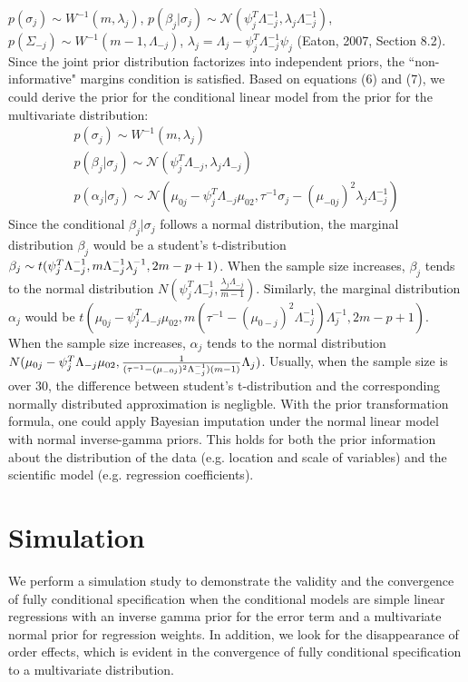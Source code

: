 	$p(\sigma_{j}) \sim W^{-1}(m, \lambda_j)$, $p(\beta_{j}|\sigma_{j}) \sim \mathcal{N}(\psi_{j}^T\Lambda_{-j}^{-1}, \lambda_j\Lambda_{-j}^{-1})$, $p(\Sigma_{-j}) \sim W^{-1}(m-1, \Lambda_{-j})$, $\lambda_j = \Lambda_{j} - \psi_{j}^T\Lambda_{-j}^{-1}\psi_{j}$ (Eaton, 2007, Section 8.2). Since the joint prior distribution factorizes into independent priors, the ``non-informative" margins condition is satisfied. Based on equations (6) and (7), we could derive the prior for the conditional linear model from the prior for the multivariate distribution:
	\begin{equation}
		\begin{array}{l}
			p(\sigma_{j}) \sim W^{-1}(m, \lambda_j)\\
			p(\beta_{j}|\sigma_{j}) \sim \mathcal{N}(\psi_{j}^T\Lambda_{-j}, \lambda_j\Lambda_{-j})\\
			p(\alpha_{j}|\sigma_{j}) \sim \mathcal{N}(\mu_{0j} - \psi_{j}^T\Lambda_{-j}\mu_{02}, \tau^{-1}\sigma_{j} - (\mu_{-0j})^{2}\lambda_j\Lambda_{-j}^{-1})
		\end{array}
	\end{equation} 
	Since the conditional $\beta_{j} | \sigma_{j}$ follows a normal distribution, the marginal distribution $\beta_{j}$ would be a student's t-distribution $\beta_{j} \sim t(\psi_{j}^T\Lambda_{-j}^{-1}, \\m\Lambda_{-j}^{-1}\lambda_{j}^{-1}, 2m-p+1)$. When the sample size increases, $\beta_{j}$ tends to the normal distribution $N(\psi_{j}^T\Lambda_{-j}^{-1}, \frac{\lambda_{j}\Lambda_{-j}}{m-1})$. Similarly, the marginal distribution $\alpha_{j}$ would be $t(\mu_{0j} - \psi_{j}^T\Lambda_{-j}\mu_{02}, m(\tau^{-1} - (\mu_{0-j})^{2}\Lambda_{-j}^{-1})\Lambda_{j}^{-1}, 2m-p+1)$. When the sample size increases, $\alpha_{j}$ tends to the normal distribution $N(\mu_{0j} - \psi_{j}^T\Lambda_{-j}\mu_{02},\\
	\frac{1}{(\tau^{-1} - (\mu_{-0j})^{2}\Lambda_{-j}^{-1})(m-1)}\Lambda_{j})$. Usually, when the sample size is over 30, the difference between student's t-distribution and the corresponding normally distributed approximation is negligble. With the prior transformation formula, one could apply Bayesian imputation under the normal linear model with normal inverse-gamma priors. This holds for both the prior information about the distribution of the data (e.g. location and scale of variables) and the scientific model (e.g. regression coefficients).  
	
	\section{Simulation}
	We perform a simulation study to demonstrate the validity and the convergence of fully conditional specification when the conditional models are simple linear regressions with an inverse gamma prior for the error term and a multivariate normal prior for regression weights. In addition, we look for the disappearance of order effects, which is evident in the convergence of fully conditional specification to a multivariate distribution. 
	
